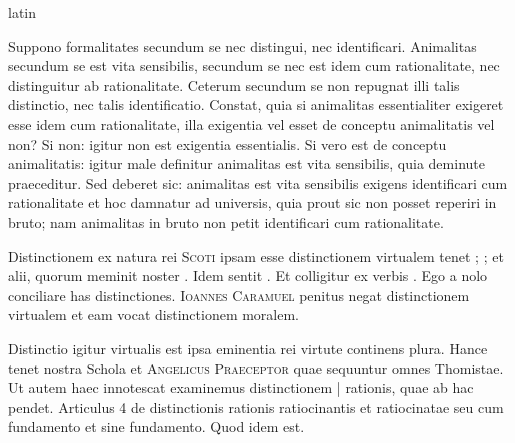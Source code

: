 \begin{otherlanguage*}{latin}
        \pstart
        \pend
      
\pstart
 Suppono formalitates secundum se nec distingui, nec identificari. Animalitas secundum se est vita sensibilis, secundum se nec est idem cum rationalitate, nec distinguitur ab rationalitate. Ceterum secundum se non repugnat illi talis distinctio, nec talis identificatio. Constat, quia si animalitas essentialiter exigeret esse idem cum rationalitate, illa exigentia vel esset de conceptu animalitatis vel non? Si non: igitur non est exigentia essentialis. Si vero est de conceptu animalitatis: igitur male definitur animalitas est vita sensibilis, quia deminute praeceditur. Sed deberet sic: animalitas est vita sensibilis exigens identificari cum rationalitate et hoc damnatur ad universis, quia prout sic non posset reperiri in bruto; nam animalitas in bruto non petit identificari cum rationalitate. 
\pend

\pstart
 Distinctionem ex natura rei \textsc{Scoti} ipsam esse distinctionem virtualem tenet ; ; et alii, quorum meminit noster . Idem sentit . Et colligitur ex verbis . Ego a nolo conciliare has distinctiones. \textsc{Ioannes Caramuel} penitus negat distinctionem virtualem et eam vocat distinctionem moralem. 
\pend

\pstart
 Distinctio igitur virtualis est ipsa eminentia rei virtute continens plura. Hance tenet nostra Schola et \textsc{Angelicus Praeceptor} quae sequuntur omnes Thomistae. Ut autem haec innotescat examinemus distinctionem \textnormal{|} rationis, quae ab hac pendet. Articulus 4 de distinctionis rationis ratiocinantis et ratiocinatae seu cum fundamento et sine fundamento. Quod idem est. 
\pend


\end{otherlanguage*}
